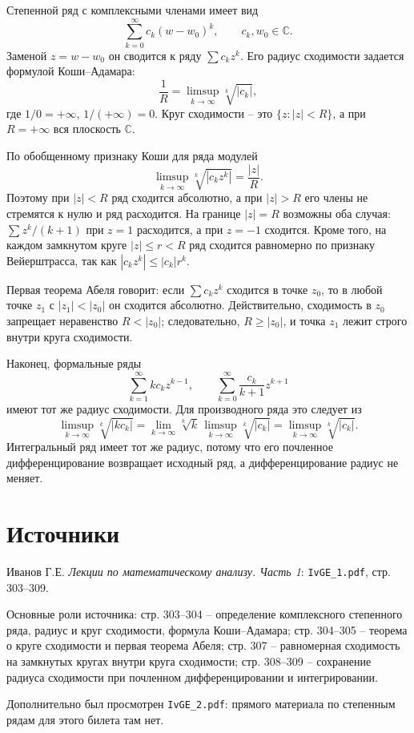 \documentclass[12pt,a4paper]{article}
\newcommand{\CC}{\mathbb{C}}
\begin{document}
Степенной ряд с комплексными членами имеет вид
\[
  \sum_{k=0}^{\infty}c_k(w-w_0)^k,\qquad c_k,w_0\in\CC.
\]
Заменой \(z=w-w_0\) он сводится к ряду \(\sum c_kz^k\). Его радиус
сходимости задается формулой Коши--Адамара:
\[
  \frac1R=\limsup_{k\to\infty}\sqrt[k]{|c_k|},
\]
где \(1/0=+\infty\), \(1/(+\infty)=0\). Круг сходимости -- это
\(\{z: |z|<R\}\), а при \(R=+\infty\) вся плоскость \(\CC\).

По обобщенному признаку Коши для ряда модулей
\[
  \limsup_{k\to\infty}\sqrt[k]{|c_kz^k|}=\frac{|z|}{R}.
\]
Поэтому при \(|z|<R\) ряд сходится абсолютно, а при \(|z|>R\) его члены не
стремятся к нулю и ряд расходится. На границе \(|z|=R\) возможны оба случая:
\(\sum z^k/(k+1)\) при \(z=1\) расходится, а при \(z=-1\) сходится. Кроме
того, на каждом замкнутом круге \(|z|\le r<R\) ряд сходится равномерно по
признаку Вейерштрасса, так как \(|c_kz^k|\le |c_k|r^k\).

Первая теорема Абеля говорит: если \(\sum c_kz^k\) сходится в точке \(z_0\),
то в любой точке \(z_1\) с \(|z_1|<|z_0|\) он сходится абсолютно.
Действительно, сходимость в \(z_0\) запрещает неравенство \(R<|z_0|\);
следовательно, \(R\ge |z_0|\), и точка \(z_1\) лежит строго внутри круга
сходимости.

Наконец, формальные ряды
\[
  \sum_{k=1}^{\infty}kc_kz^{k-1},
  \qquad
  \sum_{k=0}^{\infty}\frac{c_k}{k+1}z^{k+1}
\]
имеют тот же радиус сходимости. Для производного ряда это следует из
\[
  \limsup_{k\to\infty}\sqrt[k]{|kc_k|}
  =
  \lim_{k\to\infty}\sqrt[k]{k}\,
  \limsup_{k\to\infty}\sqrt[k]{|c_k|}
  =
  \limsup_{k\to\infty}\sqrt[k]{|c_k|}.
\]
Интегральный ряд имеет тот же радиус, потому что его почленное
дифференцирование возвращает исходный ряд, а дифференцирование радиус не
меняет.

\section*{Источники}

Иванов Г.Е. \emph{Лекции по математическому анализу. Часть 1}:
\texttt{IvGE\_1.pdf}, стр. 303--309.

Основные роли источника: стр. 303--304 -- определение комплексного
степенного ряда, радиус и круг сходимости, формула Коши--Адамара;
стр. 304--305 -- теорема о круге сходимости и первая теорема Абеля;
стр. 307 -- равномерная сходимость на замкнутых кругах внутри круга
сходимости; стр. 308--309 -- сохранение радиуса сходимости при почленном
дифференцировании и интегрировании.

Дополнительно был просмотрен \texttt{IvGE\_2.pdf}: прямого материала по
степенным рядам для этого билета там нет.
\end{document}
